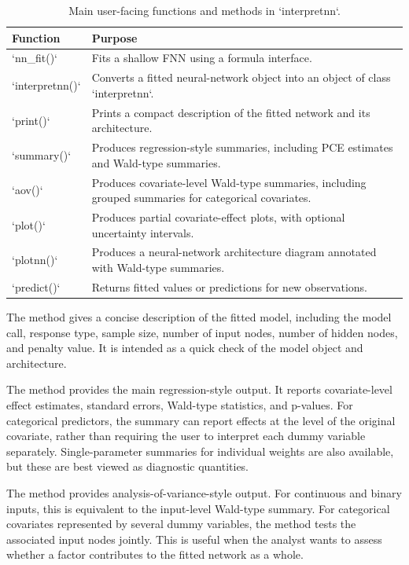 \begin{table}

\caption{\label{tab:interpretnn-methods-table}Main user-facing functions and methods in `interpretnn`.}
\centering
\begin{tabular}[t]{l|l}
\hline
Function & Purpose\\
\hline
`nn\_fit()` & Fits a shallow FNN using a formula interface.\\
\hline
`interpretnn()` & Converts a fitted neural-network object into an object of class `interpretnn`.\\
\hline
`print()` & Prints a compact description of the fitted network and its architecture.\\
\hline
`summary()` & Produces regression-style summaries, including PCE estimates and Wald-type summaries.\\
\hline
`aov()` & Produces covariate-level Wald-type summaries, including grouped summaries for categorical covariates.\\
\hline
`plot()` & Produces partial covariate-effect plots, with optional uncertainty intervals.\\
\hline
`plotnn()` & Produces a neural-network architecture diagram annotated with Wald-type summaries.\\
\hline
`predict()` & Returns fitted values or predictions for new observations.\\
\hline
\end{tabular}
\end{table}

The  method gives a concise description of the fitted model, including the model call, response type, sample size, number of input nodes, number of hidden nodes, and penalty value.
It is intended as a quick check of the model object and architecture.

The  method provides the main regression-style output.
It reports covariate-level effect estimates, standard errors, Wald-type statistics, and p-values.
For categorical predictors, the summary can report effects at the level of the original covariate, rather than requiring the user to interpret each dummy variable separately.
Single-parameter summaries for individual weights are also available, but these are best viewed as diagnostic quantities.

The  method provides analysis-of-variance-style output.
For continuous and binary inputs, this is equivalent to the input-level Wald-type summary.
For categorical covariates represented by several dummy variables, the method tests the associated input nodes jointly.
This is useful when the analyst wants to assess whether a factor contributes to the fitted network as a whole.

